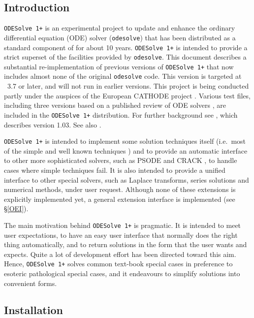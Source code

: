 
\newcommand{\ODESolve}[1]{\texttt{ODESolve\,#1}}
\newcommand{\odesolve}{\texttt{odesolve}}


\subsection{Introduction}

\ODESolve{1+} is an experimental project to update and enhance the
ordinary differential equation (ODE) solver (\odesolve{}) that has
been distributed as a standard component of \REDUCE{}
\cite{Hearn-manual,MacCallum-doc,MacCallum-ISSAC} for about 10 years.
\ODESolve{1+} is intended to provide a strict superset of the
facilities provided by \odesolve{}.  This document describes a
substantial re-implementation of previous versions of \ODESolve{1+}
that now includes almost none of the original \odesolve{} code.  This
version is targeted at \REDUCE~3.7 or later, and will not run in
earlier versions.  This project is being conducted partly under the
auspices of the European CATHODE project \cite{CATHODE}.  Various test
files, including three versions based on a published review of ODE
solvers \cite{Zimmermann}, are included in the \ODESolve{1+}
distribution.  For further background see \cite{FJW1}, which describes
version 1.03.  See also \cite{FJW2}.

\ODESolve{1+} is intended to implement some solution techniques itself
(i.e.\ most of the simple and well known techniques \cite{Zwillinger})
and to provide an automatic interface to other more sophisticated
solvers, such as PSODE \cite{Man,Man-MacCallum,Prelle-Singer} and
CRACK \cite{CRACK-doc}, to handle cases where simple techniques fail.
It is also intended to provide a unified interface to other special
solvers, such as Laplace transforms, series solutions and numerical
methods, under user request.  Although none of these extensions is
explicitly implemented yet, a general extension interface is
implemented (see \S\ref{OEI}).

The main motivation behind \ODESolve{1+} is pragmatic.  It is intended
to meet user expectations, to have an easy user interface that
normally does the right thing automatically, and to return solutions
in the form that the user wants and expects.  Quite a lot of
development effort has been directed toward this aim.  Hence,
\ODESolve{1+} solves common text-book special cases in preference to
esoteric pathological special cases, and it endeavours to simplify
solutions into convenient forms.


\subsection{Installation}

